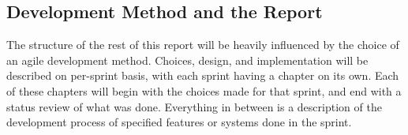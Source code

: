 \subsection{Development Method and the Report}
The structure of the rest of this report will be heavily influenced by the choice of an agile development method. Choices, design, and implementation will be described on per-sprint basis, with each sprint having a chapter on its own. Each of these chapters will begin with the choices made for that sprint, and end with a status review of what was done. Everything in between is a description of the development process of specified features or systems done in the sprint.
